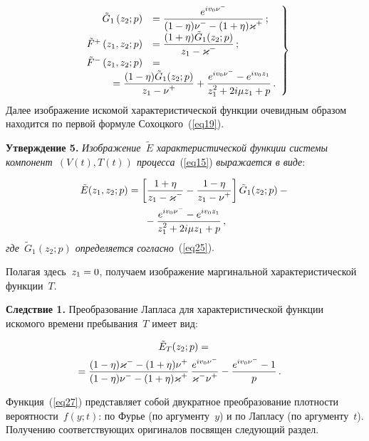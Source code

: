 \begin{multicols}{2}
\noindent
\begin{equation}
\left.
  \begin{array}{rl}
   \tilde G_1  \left(z_2; p\right) &= \fr{e^{i v_0 \nu^-}}{(1- \eta)\nu^- - (1+\eta)\varkappa^+}\,;\\
   \tilde F^+\left(z_1, z_2; p\right) &= \fr{(1+\eta)\tilde G_1(z_2; p)}{z_1-\varkappa^-}\,;\\
   \tilde F^-\left(z_1, z_2; p\right) &={}\\
    &\hspace*{-15mm}{}=\fr{(1-\eta)\tilde G_1(z_2; p)}{z_1-\nu^+} + \fr{e^{i v_0 \nu^-} - e^{i v_0 z_1}}{z_1^2 +2i \mu   z_1 + p}\,.
  \end{array}
\right\}
    \label{eq25}
\end{equation}
Далее изображение искомой характеристической функции очевидным образом находится по первой формуле Сохоцкого~(\ref{eq19}).
\smallskip

\noindent
\textbf{Утверждение 5.}
\textit{Изображение~$\tilde E$ характеристической функции системы компонент~$(V(t), T(t))$ процесса}~(\ref{eq15}) \textit{выражается в виде}:

\noindent
  \begin{multline}
    \label{eq26}
    \tilde E(z_1, z_2; p) = \left[\displaystyle\frac{\displaystyle 1+\eta\mathstrut}{\displaystyle z_1-\varkappa^-\mathstrut} - \displaystyle\frac{\displaystyle 1-\eta\mathstrut}{\displaystyle z_1-\nu^+\mathstrut}\right] \tilde G_1(z_2; p) - {}\\
    {}-\displaystyle\frac{\displaystyle e^{i v_0 \nu^-} - e^{i v_0 z_1}\mathstrut}{\displaystyle z_1^2 +2i \mu   z_1 + p\mathstrut}\,,
  \end{multline}
  \textit{где~$\tilde G_1(z_2; p)$ определяется согласно}~(\ref{eq25}).


\smallskip

Полагая здесь~$z_1\hm=0$, получаем изображение маргинальной характеристической функции~$T$.

\smallskip

\noindent
\textbf{Следствие 1.}
  Преобразование Лапласа для характеристической функции искомого времени пребывания~$T$ имеет вид:

  \noindent
  \begin{multline}
    \tilde E_{T}(z_2; p) ={}\\
     \hspace*{-6mm}{}=\fr{(1-\eta)\varkappa^- - (1+\eta)\nu^+}{(1- \eta)\nu^- - (1+\eta)\varkappa^+} \,
     \fr{e^{i v_0 \nu^-}}{\varkappa^- \nu^+} - \fr{e^{i v_0 \nu^-} - 1}{p}\,.\!\!
         \label{eq27}
  \end{multline}

Функция~(\ref{eq27}) представляет собой двукратное преобразование плотности вероятности~$f(y; t)$: по Фурье (по аргументу~$y$) и по Лапласу (по аргументу~$t$). Получению соответствующих оригиналов посвящен следующий раздел.


\end{multicols}
